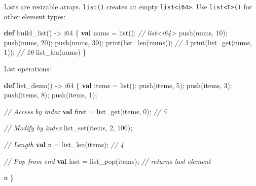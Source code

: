 \documentclass[
  english,
]{book}
\newenvironment{Shaded}{\begin{snugshade}}{\end{snugshade}}
\newcommand{\CommentTok}[1]{\textcolor[rgb]{0.42,0.60,0.33}{\textit{#1}}}
\newcommand{\DataTypeTok}[1]{\textcolor[rgb]{0.31,0.79,0.69}{#1}}
\newcommand{\DecValTok}[1]{\textcolor[rgb]{0.71,0.81,0.66}{#1}}
\newcommand{\FunctionTok}[1]{\textcolor[rgb]{0.86,0.86,0.67}{#1}}
\newcommand{\KeywordTok}[1]{\textcolor[rgb]{0.34,0.61,0.84}{\textbf{#1}}}
\newcommand{\NormalTok}[1]{\textcolor[rgb]{0.83,0.83,0.83}{#1}}
\newcommand{\OperatorTok}[1]{\textcolor[rgb]{0.83,0.83,0.83}{#1}}
\begin{document}
Lists are resizable arrays. \texttt{list()} creates an empty
\texttt{list\textless{}i64\textgreater{}}. Use
\texttt{list\textless{}T\textgreater{}()} for other element types:

\begin{Shaded}
\begin{Highlighting}[]
\KeywordTok{def}\NormalTok{ build\_list() }\OperatorTok{{-}\textgreater{}} \DataTypeTok{i64}\NormalTok{ \{}
    \KeywordTok{val}\NormalTok{ nums }\OperatorTok{=} \DataTypeTok{list}\NormalTok{();           }\CommentTok{// list\textless{}i64\textgreater{}}
    \FunctionTok{push}\NormalTok{(nums, }\DecValTok{10}\NormalTok{);}
    \FunctionTok{push}\NormalTok{(nums, }\DecValTok{20}\NormalTok{);}
    \FunctionTok{push}\NormalTok{(nums, }\DecValTok{30}\NormalTok{);}
    \FunctionTok{print}\NormalTok{(}\FunctionTok{list\_len}\NormalTok{(nums));       }\CommentTok{// 3}
    \FunctionTok{print}\NormalTok{(}\FunctionTok{list\_get}\NormalTok{(nums, }\DecValTok{1}\NormalTok{));    }\CommentTok{// 20}
    \FunctionTok{list\_len}\NormalTok{(nums)}
\NormalTok{\}}
\end{Highlighting}
\end{Shaded}

List operations:

\begin{Shaded}
\begin{Highlighting}[]
\KeywordTok{def}\NormalTok{ list\_demo() }\OperatorTok{{-}\textgreater{}} \DataTypeTok{i64}\NormalTok{ \{}
    \KeywordTok{val}\NormalTok{ items }\OperatorTok{=} \DataTypeTok{list}\NormalTok{();}
    \FunctionTok{push}\NormalTok{(items, }\DecValTok{5}\NormalTok{);}
    \FunctionTok{push}\NormalTok{(items, }\DecValTok{3}\NormalTok{);}
    \FunctionTok{push}\NormalTok{(items, }\DecValTok{8}\NormalTok{);}
    \FunctionTok{push}\NormalTok{(items, }\DecValTok{1}\NormalTok{);}

    \CommentTok{// Access by index}
    \KeywordTok{val}\NormalTok{ first }\OperatorTok{=} \FunctionTok{list\_get}\NormalTok{(items, }\DecValTok{0}\NormalTok{);     }\CommentTok{// 5}

    \CommentTok{// Modify by index}
    \FunctionTok{list\_set}\NormalTok{(items, }\DecValTok{2}\NormalTok{, }\DecValTok{100}\NormalTok{);}

    \CommentTok{// Length}
    \KeywordTok{val}\NormalTok{ n }\OperatorTok{=} \FunctionTok{list\_len}\NormalTok{(items);       }\CommentTok{// 4}

    \CommentTok{// Pop from end}
    \KeywordTok{val}\NormalTok{ last }\OperatorTok{=} \FunctionTok{list\_pop}\NormalTok{(items);    }\CommentTok{// returns last element}

\NormalTok{    n}
\NormalTok{\}}
\end{Highlighting}
\end{Shaded}
\end{document}
